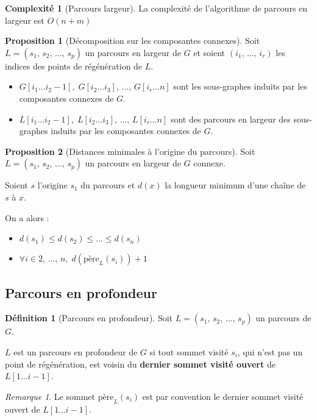 \documentclass[11pt,english,french]{scrreprt}
\theoremstyle{remark}
\newtheorem*{rem*}{Remarque}
\theoremstyle{definition}
\newtheorem*{def*}{Définition}
\newtheorem*{prop*}{Proposition}
\newtheorem*{comp*}{Complexité}
\begin{document}
\begin{comp*}[Parcours largeur]
	La complexité de l'algorithme de parcours en largeur est $O(n+m)$
\end{comp*}

\begin{prop*}[Décomposition sur les composantes connexes]
		Soit $L=(s_1,\,s_2,\,\dots,\,s_p)$ un parcours en largeur de $G$ et soient $(i_1,\,\dots,\,i_r)$ les indices des points de régénération de $L$.
		\begin{itemize}
				\item $G[i_1\dots i_2-1],\;G[i_2\dots i_3],\,\dots,\,G[i_r\dots n]$ sont les sous-graphes induits par les composantes connexes de $G$.
				\item $L[i_1\dots i_2-1],\;L[i_2\dots i_3],\,\dots,\,L[i_r\dots n]$ sont des parcours en largeur des sous-graphes induits par les composantes connexes de $G$.
		\end{itemize}
\end{prop*}

\begin{prop*}[Distances minimales à l'origine du parcours]
	Soit $L=(s_1,\,s_2,\,\dots,\,s_p)$ un parcours en largeur de $G$ connexe.
	
	Soient $s$ l'origine $s_1$ du parcours et $d(x)$ la longueur minimum d'une chaîne de $s$ à $x$.
	
	On a alors :\begin{itemize}
		\item $d(s_1)\leqslant d(s_2)\leqslant\dots\leqslant d(s_n)$
		\item $\forall i \in {2,\,\dots,\,n},\;d(\textrm{père}_L(s_i))+1$
	\end{itemize}
\end{prop*}

\subsection{Parcours en profondeur} %
\begin{def*}[Parcours en profondeur]
	Soit $L=(s_1,\,s_2,\,\dots,\,s_p)$ un parcours de $G$.
	
	$L$ est un parcours en profondeur de $G$ si tout sommet visité $s_i$, qui n'est pas un point de régénération, est voisin du \textbf{dernier sommet visité ouvert} de $L[1\dots i-1]$.
\end{def*}

\begin{rem*}
	Le sommet $\textrm{père}_L(s_i)$ est par convention le dernier sommet visité ouvert de $L[1\dots i-1]$.
\end{rem*}
\end{document}
